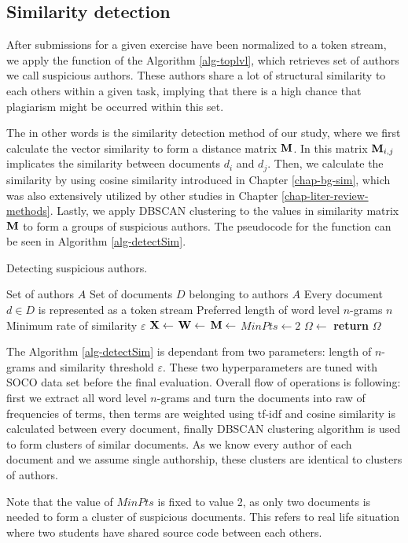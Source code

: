 \subsection{Similarity detection}


After submissions for a given exercise have been normalized to a token stream, we apply the  function of the Algorithm \ref{alg-toplvl}, which retrieves set of authors we call suspicious authors. These authors share a lot of structural similarity to each others within a given task, implying that there is a high chance that plagiarism might be occurred within this set. 

The  in other words is the similarity detection method of our study, where we first calculate the vector similarity to form a distance matrix $\mathbf{M}$. In this matrix $\mathbf{M}_{i,j}$ implicates the similarity between documents $d_i$ and $d_j$. Then, we calculate the similarity by using cosine similarity introduced in Chapter \ref{chap-bg-sim}, which was also extensively utilized by other studies in Chapter \ref{chap-liter-review-methods}. Lastly, we apply DBSCAN clustering to the values in similarity matrix $\mathbf{M}$ to form a groups of suspicious authors. The pseudocode for the  function can be seen in Algorithm \ref{alg-detectSim}.

\begin{algorithm}[ht]
\caption{Detecting suspicious authors.}
\label{alg-detectSim}
\begin{algorithmic}

\Require Set of authors $A$
\Require Set of documents $D$ belonging to authors $A$
\Require Every document $d \in D$ is represented as a token stream
\Require Preferred length of word level $n$-grams $n$
\Require Minimum rate of similarity $\varepsilon$
   \State $\mathbf{X} \gets$ 
   \State $\mathbf{W} \gets$ 
   \State $\mathbf{M} \gets$ 
   \State $MinPts \gets 2$
   \State $\Omega \gets$ 
   \State \textbf{return} $\Omega$
\EndProcedure
\end{algorithmic}
\end{algorithm}

\noindent
The Algorithm \ref{alg-detectSim} is dependant from two parameters: length of $n$-grams and similarity threshold $\varepsilon$. These two hyperparameters are tuned with SOCO data set before the final evaluation. Overall flow of operations is following: first we extract all word level $n$-grams and turn the documents into raw of frequencies of terms, then terms are weighted using tf-idf and cosine similarity is calculated between every document, finally DBSCAN clustering algorithm is used to form clusters of similar documents. As we know every author of each document and we assume single authorship, these clusters are identical to clusters of authors. 

Note that the value of $MinPts$ is fixed to value 2, as only two documents is needed to form a cluster of suspicious documents. This refers to real life situation where two students have shared source code between each others. 